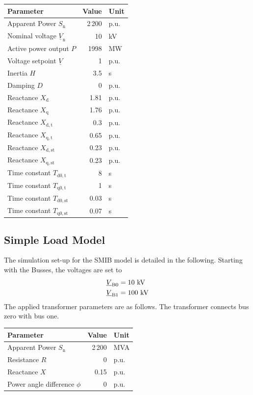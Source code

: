\begin{tabularx}{\textwidth}{Xrl}
    \textbf{Parameter} & \textbf{Value} & \textbf{Unit} \\ \hline
    \toprule
    Apparent Power $S_\mathrm{n}$ & 2\,200 & p.u. \\
    Nominal voltage $\underline{V}_\mathrm{n}$ & 10 & kV \\
    Active power output $P$ & 1998 & MW \\
    Voltage setpoint $\underline{V}$ & 1 & p.u. \\
    Inertia $H$ & 3.5 & s \\
    Damping $D$ & 0 & p.u. \\
    Reactance $X_\mathrm{d}$ & 1.81 & p.u. \\
    Reactance $X_\mathrm{q}$ & 1.76 & p.u. \\
    Reactance $X_\mathrm{d,t}$ & 0.3 & p.u. \\
    Reactance $X_\mathrm{q,t}$ & 0.65 & p.u. \\
    Reactance $X_\mathrm{d,st}$ & 0.23 & p.u. \\
    Reactance $X_\mathrm{q,st}$ & 0.23 & p.u. \\
    Time constant $T_\mathrm{d0,t}$ & 8 & s \\
    Time constant $T_\mathrm{q0,t}$ & 1 & s \\
    Time constant $T_\mathrm{d0,st}$ & 0.03 & s \\
    Time constant $T_\mathrm{q0,st}$ & 0.07 & s \\
    \bottomrule
\end{tabularx}

\vspace*{1cm}

\subsection{Simple Load Model}
\label{app:smib-w-load}

The simulation set-up for the \acs{SMIB} model is detailed in the following.
Starting with the Busses, the voltages are set to
\begin{align}
    \underline{V}_\mathrm{B0} &= 10\text{ kV} \notag \\
    \underline{V}_\mathrm{B1} &= 100\text{ kV} \notag 
\end{align}
The applied transformer parameters are as follows.
The transformer connects bus zero with bus one.

\begin{tabularx}{\textwidth}{Xrl}
    \textbf{Parameter} & \textbf{Value} & \textbf{Unit} \\ \hline
    \toprule
    Apparent Power $S_\mathrm{n}$ & 2\,200 & MVA \\
    Resistance $R$ & 0 & p.u. \\
    Reactance $X$ & 0.15 & p.u. \\
    Power angle difference $\phi$ & 0 & p.u. \\
    \bottomrule
\end{tabularx}

